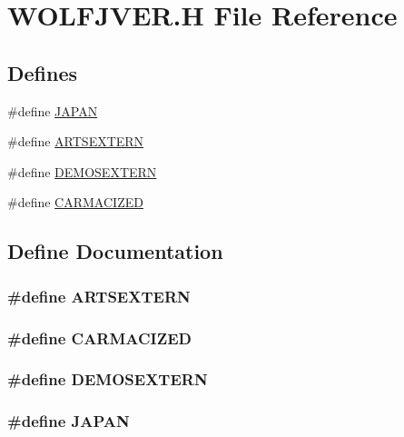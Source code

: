 \hypertarget{WOLFJVER_8H}{
\section{WOLFJVER.H File Reference}
\label{WOLFJVER_8H}
}
\subsection*{Defines}
\begin{DoxyCompactItemize}
\item 
\#define \hyperlink{WOLFJVER_8H_ade10b2b7da4d05be852a9fa90c7a1b2b}{JAPAN}
\item 
\#define \hyperlink{WOLFJVER_8H_a36e8622d432bb1dcfc61ac233148b685}{ARTSEXTERN}
\item 
\#define \hyperlink{WOLFJVER_8H_aa38bbec192ab8931f108d382f7833c31}{DEMOSEXTERN}
\item 
\#define \hyperlink{WOLFJVER_8H_ab1d0a23b2e2640f4fbf73f30b3586f1b}{CARMACIZED}
\end{DoxyCompactItemize}


\subsection{Define Documentation}
\hypertarget{WOLFJVER_8H_a36e8622d432bb1dcfc61ac233148b685}{
\subsubsection[{ARTSEXTERN}]{\setlength{\rightskip}{0pt plus 5cm}\#define ARTSEXTERN}}
\label{WOLFJVER_8H_a36e8622d432bb1dcfc61ac233148b685}
\hypertarget{WOLFJVER_8H_ab1d0a23b2e2640f4fbf73f30b3586f1b}{
\subsubsection[{CARMACIZED}]{\setlength{\rightskip}{0pt plus 5cm}\#define CARMACIZED}}
\label{WOLFJVER_8H_ab1d0a23b2e2640f4fbf73f30b3586f1b}
\hypertarget{WOLFJVER_8H_aa38bbec192ab8931f108d382f7833c31}{
\subsubsection[{DEMOSEXTERN}]{\setlength{\rightskip}{0pt plus 5cm}\#define DEMOSEXTERN}}
\label{WOLFJVER_8H_aa38bbec192ab8931f108d382f7833c31}
\hypertarget{WOLFJVER_8H_ade10b2b7da4d05be852a9fa90c7a1b2b}{
\subsubsection[{JAPAN}]{\setlength{\rightskip}{0pt plus 5cm}\#define JAPAN}}
\label{WOLFJVER_8H_ade10b2b7da4d05be852a9fa90c7a1b2b}
